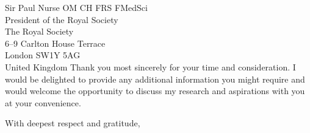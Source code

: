 \documentclass[12pt,a4paper]{letter}
\begin{document}
\begin{letter}{Sir Paul Nurse OM CH FRS FMedSci\\President of the Royal Society\\The Royal Society\\6--9 Carlton House Terrace\\London SW1Y 5AG\\United Kingdom}
Thank you most sincerely for your time and consideration. I would be delighted to provide any additional information you might require and would welcome the opportunity to discuss my research and aspirations with you at your convenience.

\closing{With deepest respect and gratitude,}

\signature{Deborah Akuoko}


\end{letter}
\end{document}

